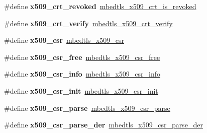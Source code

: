 \begin{DoxyCompactItemize}
\mbox{\label{compat-1_83_8h_a05369ac40d74b6da67bf08bb320fc938}} 
\#define {\bfseries x509\+\_\+crt\+\_\+revoked}~\mbox{\hyperlink{group__x509__module_ga0dc256a70f90cb68002d53bafffab232}{mbedtls\+\_\+x509\+\_\+crt\+\_\+is\+\_\+revoked}}
\item 
\mbox{\label{compat-1_83_8h_a94ca4daf44f5bffbf4681b0fe3cc2f9a}} 
\#define {\bfseries x509\+\_\+crt\+\_\+verify}~\mbox{\hyperlink{group__x509__module_ga98ed4504e4f832b735a230acf54fcde3}{mbedtls\+\_\+x509\+\_\+crt\+\_\+verify}}
\item 
\mbox{\label{compat-1_83_8h_ae0cd50d723883f9488d700930897f2c9}} 
\#define {\bfseries x509\+\_\+csr}~\mbox{\hyperlink{structmbedtls__x509__csr}{mbedtls\+\_\+x509\+\_\+csr}}
\item 
\mbox{\label{compat-1_83_8h_abc81b4184da66fe8364a90de66be9c0d}} 
\#define {\bfseries x509\+\_\+csr\+\_\+free}~\mbox{\hyperlink{group__x509__module_gac2139becff64aa7294ecad4f40767a84}{mbedtls\+\_\+x509\+\_\+csr\+\_\+free}}
\item 
\mbox{\label{compat-1_83_8h_a70bb542a38182e2d4f42b33e7ccbaac3}} 
\#define {\bfseries x509\+\_\+csr\+\_\+info}~\mbox{\hyperlink{group__x509__module_gaeec330c8cb351adc2870f4f088f36fdc}{mbedtls\+\_\+x509\+\_\+csr\+\_\+info}}
\item 
\mbox{\label{compat-1_83_8h_a7c8ac4263a9dbcac7e2c0d0b5dc6daca}} 
\#define {\bfseries x509\+\_\+csr\+\_\+init}~\mbox{\hyperlink{group__x509__module_ga984db025f6953ea61be7dfca2d928f37}{mbedtls\+\_\+x509\+\_\+csr\+\_\+init}}
\item 
\mbox{\label{compat-1_83_8h_a53f1c7467984c7061ebf469e47b1279e}} 
\#define {\bfseries x509\+\_\+csr\+\_\+parse}~\mbox{\hyperlink{group__x509__module_ga53012fb8859f4835ccfb0a5e359b3176}{mbedtls\+\_\+x509\+\_\+csr\+\_\+parse}}
\item 
\mbox{\label{compat-1_83_8h_ad3da14d109ae02360877cf83611f5733}} 
\#define {\bfseries x509\+\_\+csr\+\_\+parse\+\_\+der}~\mbox{\hyperlink{group__x509__module_ga4c58fa3804ea9feb1acf745221f17208}{mbedtls\+\_\+x509\+\_\+csr\+\_\+parse\+\_\+der}}
\item 

\end{DoxyCompactItemize}
